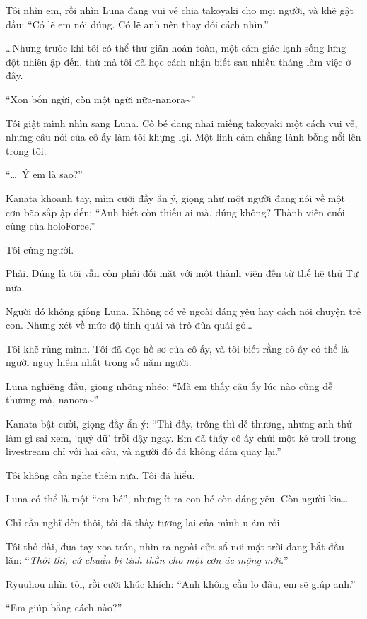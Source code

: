\documentclass[../main.tex]{subfiles}
\begin{document}
Tôi nhìn em, rồi nhìn Luna đang vui vẻ chia takoyaki cho mọi người, và khẽ gật đầu: ``Có lẽ em nói đúng. Có lẽ anh nên thay đổi cách nhìn.''

\il

\dots Nhưng trước khi tôi có thể thư giãn hoàn toàn, một cảm giác lạnh sống lưng đột nhiên ập đến, thứ mà tôi đã học cách nhận biết sau nhiều tháng làm việc ở đây.

``Xon bốn ngừi, còn một ngừi nữa-nanora\~{}''

Tôi giật mình nhìn sang Luna. Cô bé đang nhai miếng takoyaki một cách vui vẻ, nhưng câu nói của cô ấy làm tôi khựng lại. Một linh cảm chẳng lành bỗng nổi lên trong tôi.

``\dots\ Ý em là sao?''

Kanata khoanh tay, mỉm cười đầy ẩn ý, giọng như một người đang nói về một cơn bão sắp ập đến: ``Anh biết còn thiếu ai mà, đúng không? Thành viên cuối cùng của holoForce.''

Tôi cứng người.

Phải. Đúng là tôi vẫn còn phải đối mặt với một thành viên đến từ thế hệ thứ Tư nữa.

Người đó không giống Luna. Không có vẻ ngoài đáng yêu hay cách nói chuyện trẻ con. Nhưng xét về mức độ tinh quái và trò đùa quái gở\dots

Tôi khẽ rùng mình. Tôi đã đọc hồ sơ của cô ấy, và tôi biết rằng cô ấy có thể là người nguy hiểm nhất trong số năm người.

Luna nghiêng đầu, giọng nhõng nhẽo: ``Mà em thấy cậu ấy lúc nào cũng dễ thương mà, nanora\~{}''

Kanata bật cười, giọng đầy ẩn ý: ``Thì đấy, trông thì dễ thương, nhưng anh thử làm gì sai xem, `quỷ dữ' trỗi dậy ngay. Em đã thấy cô ấy chửi một kẻ troll trong livestream chỉ với hai câu, và người đó đã không dám quay lại.''

Tôi không cần nghe thêm nữa. Tôi đã hiểu.

Luna có thể là một ``em bé'', nhưng ít ra con bé còn đáng yêu. Còn người kia\dots

Chỉ cần nghĩ đến thôi, tôi đã thấy tương lai của mình u ám rồi.

Tôi thở dài, đưa tay xoa trán, nhìn ra ngoài cửa sổ nơi mặt trời đang bắt đầu lặn: ``\textit{Thôi thì, cứ chuẩn bị tinh thần cho một cơn ác mộng mới.}''

Ryuuhou nhìn tôi, rồi cười khúc khích: ``Anh không cần lo đâu, em sẽ giúp anh.''

``Em giúp bằng cách nào?''
\end{document}

